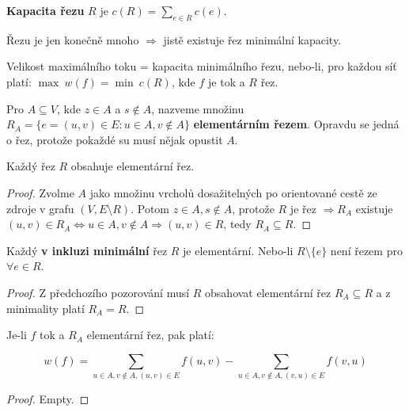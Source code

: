 \begin{definice}
	\textbf{Kapacita řezu} $R$ je $c(R) = \sum_{e \in R}c(e)$.
\end{definice}

Řezu je jen konečně mnoho $\Rightarrow$ jistě existuje řez minimální kapacity.

\begin{veta}
	Velikost maximálního toku = kapacita minimálního řezu, nebo-li, pro každou síť platí: $\max \ w(f) = \min \ c(R)$, kde $f$ je tok a $R$ řez.
\end{veta}

\begin{definice}
	Pro $A \subseteq V$, kde $z \in A$ a $s \notin A$, nazveme množinu $R_A = \{ e = (u,v) \in E: u \in A, v \notin A\}$ \textbf{elementárním řezem}. Opravdu se jedná o řez, protože pokaždé su musí nějak opustit $A$.
\end{definice}

\begin{pozor}
	Každý řez $R$ obsahuje elementární řez.
\end{pozor}

\begin{proof}
	Zvolme $A$ jako množinu vrcholů dosažitelných po orientované cestě ze zdroje v grafu $(V, E \setminus R)$. Potom $z \in A, s \notin A$, protože $R$ je řez $\Rightarrow R_A$ existuje $(u,v) \in R_A \Leftrightarrow u \in A, v \notin A \Rightarrow (u,v) \in R$, tedy $R_A \subseteq R$.
\end{proof}

\begin{pozor}
	Každý \textbf{v inkluzi minimální} řez $R$ je elementární. Nebo-li $R \setminus \{ e \}$ není řezem pro $\forall e \in R$.
\end{pozor}

\begin{proof}
	Z předchozího pozorování musí $R$ obsahovat elementární řez $R_A \subseteq R$ a z minimality platí $R_A = R$.
\end{proof}

\begin{lemma}
	Je-li $f$ tok a $R_A$ elementární řez, pak platí:
	
	$$
	w(f) = \sum_{u \in A, v \notin A, (u,v) \in E}f(u,v) - \sum_{u \in A, v \notin A, (v, u) \in E} f(v,u)
	$$
\end{lemma}

\begin{proof}
	Empty.
\end{proof}


